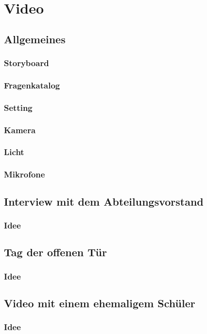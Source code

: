 \chapter{Video}
\section{Allgemeines}
\subsection{Storyboard}
\subsection{Fragenkatalog}
\subsection{Setting}
\subsection{Kamera}
\subsection{Licht}
\subsection{Mikrofone}

\section{Interview mit dem Abteilungsvorstand}
\subsection{Idee}
\section{Tag der offenen Tür}
\subsection{Idee}
\section{Video mit einem ehemaligem Schüler}
\subsection{Idee}

